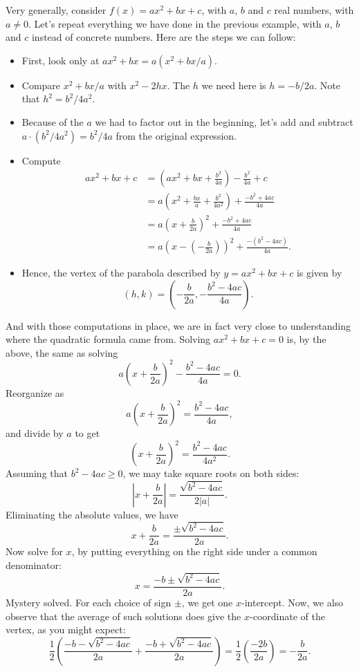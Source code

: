 \documentclass[handout, noauthor, nooutcomes]{ximera}
\begin{document}
Very generally, consider $f(x) = ax^2+bx+c$, with $a$, $b$ and $c$ real numbers, with $a \neq 0$. Let's repeat everything we have done in the previous example, with $a$, $b$ and $c$ instead of concrete numbers. Here are the steps we can follow:

\begin{itemize}
\item First, look only at $ax^2 + bx = a(x^2 + bx/a)$.
\item Compare $x^2+bx/a$ with $x^2-2hx$. The $h$ we need here is $h = -b/2a$. Note that $h^2 = b^2/4a^2$.
\item Because of the $a$ we had to factor out in the beginning, let's add and subtract $a \cdot (b^2/4a^2) = b^2/4a$ from the original expression.
\item Compute \begin{align*}  ax^2+bx+c &= \left(ax^2+bx + \frac{b^2}{4a}\right) - \frac{b^2}{4a}+c \\ &= a\left(x^2+\frac{bx}{a} + \frac{b^2}{4a^2}\right) + \frac{-b^2+4ac}{4a} \\ &= a\left(x+\frac{b}{2a}\right)^2+\frac{-b^2+4ac}{4a} \\ &= a\left(x - \left(-\frac{b}{2a}\right)\right)^2 + \frac{-(b^2-4ac)}{4a}. \end{align*}
\item Hence, the vertex of the parabola described by $y=ax^2+bx+c$ is given by $$(h,k) = \left(-\frac{b}{2a}, -\frac{b^2-4ac}{4a}\right).$$
\end{itemize}

And with those computations in place, we are in fact very close to understanding where the quadratic formula came from. Solving $ax^2+bx+c=0$ is, by the above, the same as solving $$a\left(x+\frac{b}{2a}\right)^2 - \frac{b^2-4ac}{4a} = 0.$$Reorganize as $$a\left(x+\frac{b}{2a}\right)^2 = \frac{b^2-4ac}{4a},$$and divide by $a$ to get $$\left(x+\frac{b}{2a}\right)^2 = \frac{b^2-4ac}{4a^2}.$$Assuming that $b^2-4ac \geq 0$, we may take square roots on both sides: $$\left|x+\frac{b}{2a} \right| = \frac{\sqrt{b^2-4ac}}{2|a|}.$$
Eliminating the absolute values, we have $$x+\frac{b}{2a} = \frac{\pm\sqrt{b^2-4ac}}{2a}.$$Now solve for $x$, by putting everything on the right side under a common denominator: $$x = \frac{-b\pm \sqrt{b^2-4ac}}{2a}.$$Mystery solved. For each choice of sign $\pm$, we get one $x$-intercept. Now, we also observe that the average of such solutions does give the $x$-coordinate of the vertex, as you might expect: $$\frac{1}{2}\left(\frac{-b-\sqrt{b^2-4ac}}{2a} + \frac{-b+\sqrt{b^2-4ac}}{2a}\right) = \frac{1}{2} \left(\frac{-2b}{2a}\right) = -\frac{b}{2a}.$$
\end{document}

